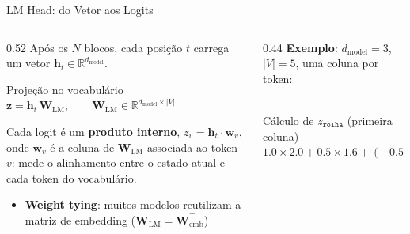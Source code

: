 \documentclass[aspectratio=169, xcolor=dvipsnames]{beamer}
\begin{document}
  \begin{frame}{LM Head: do Vetor aos Logits}
    \begin{columns}[T]
      \begin{column}{0.52\textwidth}
        Após os $N$ blocos, cada posição $t$ carrega um vetor $\mathbf{h}_t \in \mathbb{R}^{d_\text{model}}$.\\[0.4em]
        \begin{block}{Projeção no vocabulário}
          $\mathbf{z} = \mathbf{h}_t\, \mathbf{W}_\text{LM}, \qquad \mathbf{W}_\text{LM} \in \mathbb{R}^{d_\text{model} \times |V|}$
        \end{block}
        \vspace{0.3em}
        Cada logit é um \textbf{produto interno}, $z_v = \mathbf{h}_t \cdot \mathbf{w}_v$, onde $\mathbf{w}_v$ é a coluna de $\mathbf{W}_\text{LM}$ associada ao token $v$: mede o alinhamento entre o estado atual e cada token do vocabulário.
        \vspace{0.3em}
        \begin{itemize}
          \item \textbf{Weight tying}: muitos modelos reutilizam a matriz de embedding ($\mathbf{W}_\text{LM} = \mathbf{W}_\text{emb}^\top$)
        \end{itemize}
      \end{column}
      \begin{column}{0.44\textwidth}
        \footnotesize\textbf{Exemplo}: $d_\text{model}=3$, $|V|=5$, uma coluna por token:\\[0.5em]
        \\[0.6em]
        \vspace{0.5em}
        \begin{exampleblock}{\footnotesize Cálculo de $z_{\texttt{rolha}}$ (primeira coluna)}
          \scriptsize $1.0 \times 2.0 + 0.5 \times 1.6 + (-0.5) \times (-0.4) = 2.0 + 0.8 + 0.2 = 3.0$
        \end{exampleblock}
      \end{column}
    \end{columns}
  \end{frame}
\end{document}
